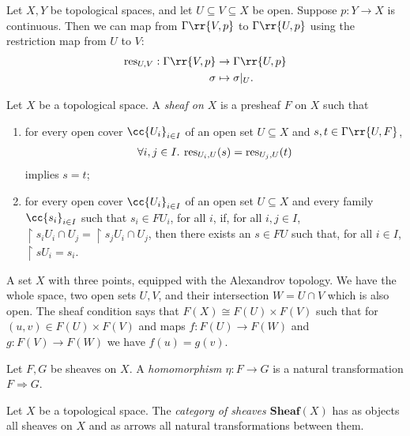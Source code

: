 \documentclass{article}
\begin{document}
\begin{example}
  Let $X, Y$ be topological spaces, and let $U \subseteq V \subseteq X$ be open. Suppose $p : Y \to X$ is continuous. Then we can map from $\Gamma\rr{V,p}$ to $\Gamma\rr{U,p}$ using the restriction map from $U$ to $V$:
  \begin{align*}
    \res_{U,V} : \Gamma\rr{V,p} &\to \Gamma\rr{U,p}\\
    \sigma &\mapsto \sigma|_U.
  \end{align*}
\end{example}

\begin{definition}
  Let $X$ be a topological space. A \emph{sheaf on $X$} is a presheaf $F$ on $X$
  such that
  \begin{enumerate}
    \item for every open cover $\cc{U_i}_{i\in I}$ of an open set $U\subseteq X$ and
      $s,t\in\Gamma\rr{U,F}$,
      \begin{align*}
        \forall i,j\in I.\: \operatorname{res}_{U_i,U}(s) = \operatorname{res}_{U_j,U}(t)
      \end{align*}
      implies $s=t$;
    \item for every open cover $\cc{U_i}_{i\in I}$ of an open set $U\subseteq X$
      and every family $\cc{s_i}_{i\in I}$ such that $s_i\in FU_i$, for all $i$,
      if, for all $i,j\in I$, $\restriction{s_i}{U_i\cap U_j} = \restriction{s_j}{U_i\cap U_j}$,
      then there exists an $s\in FU$ such that, for all $i\in I$,
      $\restriction{s}{U_i}=s_i$.
  \end{enumerate}
\end{definition}

\begin{example}
  A set $X$ with three points, equipped with the Alexandrov topology. 
  We have the whole space, two open sets $U, V$, and their intersection $W = U \cap V$ which is also open. 
  The sheaf condition says that $F(X) \cong F(U) \times F(V)$ such that for $(u, v) \in  F(U) \times F(V)$ and 
  maps $f : F(U) \to F(W)$ and $g : F(V) \to F(W)$ we have $f(u) = g(v)$. 
  \missingexample
\end{example}

\begin{definition}
  Let $F,G$ be sheaves on $X$. A \emph{homomorphism $\eta:F\to G$} is
  a natural transformation $F\Rightarrow G$.
\end{definition}

\begin{definition}
  Let $X$ be a topological space. The \emph{category of sheaves $\textbf{Sheaf}(X)$}
  has as objects all sheaves on $X$ and as arrows all natural transformations between
  them.
\end{definition}
\end{document}
